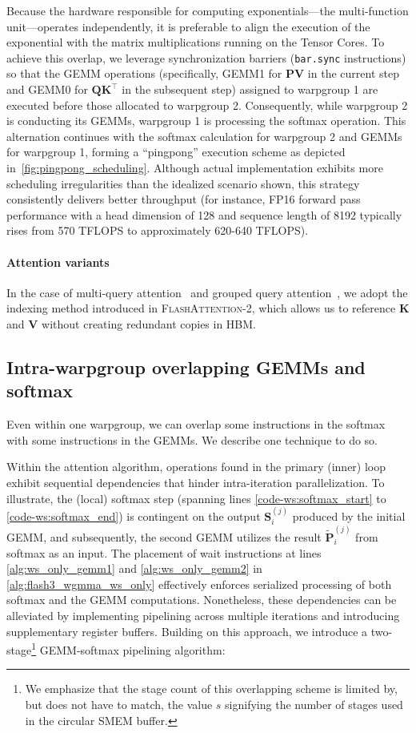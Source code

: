 Because the hardware responsible for computing exponentials—the multi-function unit—operates independently, it is preferable to align the execution of the exponential with the matrix multiplications running on the Tensor Cores. To achieve this overlap, we leverage synchronization barriers (\texttt{bar.sync} instructions) so that the GEMM operations (specifically, GEMM1 for $\mathbf{P} \mathbf{V}$ in the current step and GEMM0 for $\mathbf{Q} \mathbf{K}^\top$ in the subsequent step) assigned to warpgroup 1 are executed before those allocated to warpgroup 2. Consequently, while warpgroup 2 is conducting its GEMMs, warpgroup 1 is processing the softmax operation. This alternation continues with the softmax calculation for warpgroup 2 and GEMMs for warpgroup 1, forming a ``pingpong'' execution scheme as depicted in~\cref{fig:pingpong_scheduling}. Although actual implementation exhibits more scheduling irregularities than the idealized scenario shown, this strategy consistently delivers better throughput (for instance, FP16 forward pass performance with a head dimension of 128 and sequence length of 8192 typically rises from 570 TFLOPS to approximately 620-640 TFLOPS).

\paragraph{Attention variants} In the case of multi-query attention~\citep{shazeer2019fast} and grouped query attention~\citep{ainslie2023gqa}, we adopt the indexing method introduced in \textsc{FlashAttention-2}, which allows us to reference $\mathbf{K}$ and $\mathbf{V}$ without creating redundant copies in HBM.

\subsection{Intra-warpgroup overlapping GEMMs and softmax}

Even within one warpgroup, we can overlap some instructions in the softmax with some instructions in the GEMMs. We describe one technique to do so.

Within the attention algorithm, operations found in the primary (inner) loop exhibit sequential dependencies that hinder intra-iteration parallelization. To illustrate, the (local) softmax step (spanning lines \ref{code-ws:softmax_start} to \ref{code-ws:softmax_end}) is contingent on the output $\mathbf{S}_i^{(j)}$ produced by the initial GEMM, and subsequently, the second GEMM utilizes the result $\widetilde{\mathbf{P}}_i^{(j)}$ from softmax as an input. The placement of wait instructions at lines \ref{alg:ws_only_gemm1} and \ref{alg:ws_only_gemm2} in \cref{alg:flash3_wgmma_ws_only} effectively enforces serialized processing of both softmax and the GEMM computations. Nonetheless, these dependencies can be alleviated by implementing pipelining across multiple iterations and introducing supplementary register buffers. Building on this approach, we introduce a two-stage\footnote{We emphasize that the stage count of this overlapping scheme is limited by, but does not have to match, the value $s$ signifying the number of stages used in the circular SMEM buffer.} GEMM-softmax pipelining algorithm:

